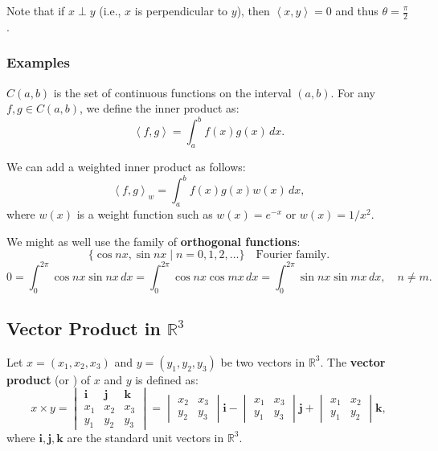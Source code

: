\documentclass[11pt]{article}
\newcommand{\inner}[2]{\left\langle #1, #2 \right\rangle}
\begin{document}
Note that if $x \perp y$ (i.e., $x$ is perpendicular to $y$), then $\inner{x}{y} = 0$ and thus $\theta = \frac{\pi}{2}$.

\subsubsection*{Examples}
$C(a, b)$ is the set of continuous functions on the interval $(a, b)$. For any $f, g \in C(a, b)$, we define the inner product as:
\[ \inner{f}{g} = \int_a^b f(x) g(x) \, dx. \]

We can add a weighted inner product as follows:
\[ \inner{f}{g}_w = \int_a^b f(x) g(x) w(x) \, dx, \]
where $w(x)$ is a weight function such as $w(x) = e^{-x}$ or $w(x) = 1/x^2$.

We might as well use the family of \textbf{orthogonal functions}:
\[\{\cos nx , \sin nx \mid n = 0, 1, 2, \ldots\} \quad \text{Fourier family}.\]
\[0 = \int^{2\pi}_0 \cos nx \sin nx \, dx = \int^{2\pi}_0 \cos nx \cos mx \, dx = \int^{2\pi}_0 \sin nx \sin mx \, dx, \quad n \neq m.\]

\subsection{Vector Product in $\mathbb{R}^3$}
Let $x = (x_1, x_2, x_3)$ and $y = (y_1, y_2, y_3)$ be two vectors in $\mathbb{R}^3$. The \textbf{vector product} (or ) of $x$ and $y$ is defined as:
\[ x \times y = \begin{vmatrix}
\mathbf{i} & \mathbf{j} & \mathbf{k} \\
x_1 & x_2 & x_3 \\
y_1 & y_2 & y_3
\end{vmatrix} = \begin{vmatrix}
x_2 & x_3 \\
y_2 & y_3
\end{vmatrix} \mathbf{i} - \begin{vmatrix}
x_1 & x_3 \\
y_1 & y_3
\end{vmatrix} \mathbf{j} + \begin{vmatrix}
x_1 & x_2 \\
y_1 & y_2
\end{vmatrix} \mathbf{k}, \]
where $\mathbf{i}, \mathbf{j}, \mathbf{k}$ are the standard unit vectors in $\mathbb{R}^3$.
\end{document}
